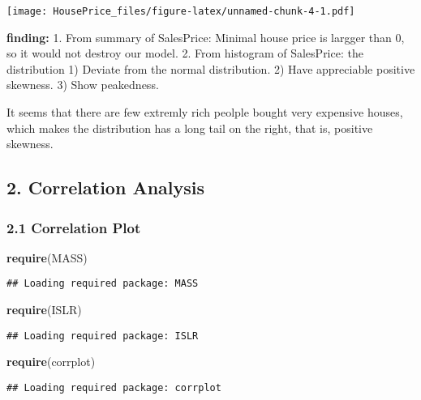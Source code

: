 \documentclass[]{article}
\newenvironment{Shaded}{\begin{snugshade}}{\end{snugshade}}
\newcommand{\KeywordTok}[1]{\textcolor[rgb]{0.13,0.29,0.53}{\textbf{#1}}}
\newcommand{\NormalTok}[1]{#1}
\begin{document}
\texttt{[image: HousePrice\_files/figure-latex/unnamed-chunk-4-1.pdf]}

\textbf{finding:} 1. From summary of SalesPrice: Minimal house price is
largger than 0, so it would not destroy our model. 2. From histogram of
SalesPrice: the distribution 1) Deviate from the normal distribution. 2)
Have appreciable positive skewness. 3) Show peakedness.

It seems that there are few extremly rich peolple bought very expensive
houses, which makes the distribution has a long tail on the right, that
is, positive skewness.

\subsection{2. Correlation Analysis}\label{correlation-analysis}

\subsubsection{2.1 Correlation Plot}\label{correlation-plot}

\begin{Shaded}
\begin{Highlighting}[]
\KeywordTok{require}\NormalTok{(MASS)}
\end{Highlighting}
\end{Shaded}

\begin{verbatim}
## Loading required package: MASS
\end{verbatim}

\begin{Shaded}
\begin{Highlighting}[]
\KeywordTok{require}\NormalTok{(ISLR)}
\end{Highlighting}
\end{Shaded}

\begin{verbatim}
## Loading required package: ISLR
\end{verbatim}

\begin{Shaded}
\begin{Highlighting}[]
\KeywordTok{require}\NormalTok{(corrplot)}
\end{Highlighting}
\end{Shaded}

\begin{verbatim}
## Loading required package: corrplot
\end{verbatim}
\end{document}

